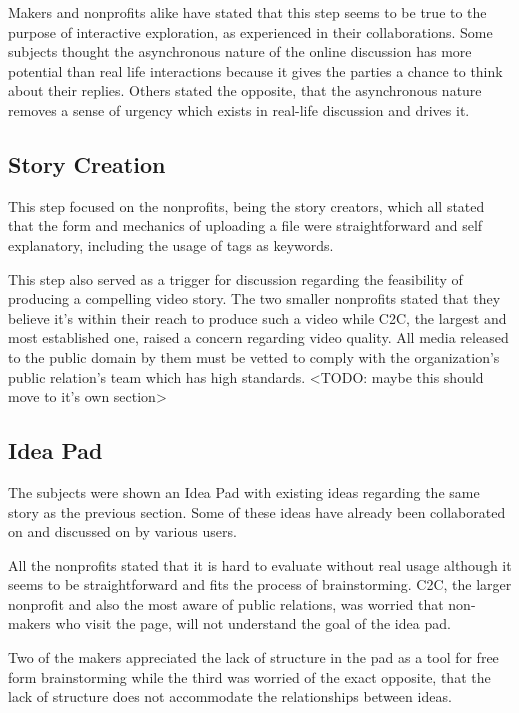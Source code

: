 Makers and nonprofits alike have stated that this step seems to be true to the purpose of interactive exploration, as experienced in their collaborations. Some subjects thought the asynchronous nature of the online discussion has more potential than real life interactions because it gives the parties a chance to think about their replies. Others stated the opposite, that the asynchronous nature removes a sense of urgency which exists in real-life discussion and drives it. 

\subsection{Story Creation}

This step focused on the nonprofits, being the story creators, which all stated that the form and mechanics of uploading a file were straightforward and self explanatory, including the usage of tags as keywords. 

This step also served as a trigger for discussion regarding the feasibility of producing a compelling video story. The two smaller nonprofits stated that they believe it's within their reach to produce such a video while C2C, the largest and most established one, raised a concern regarding video quality. All media released to the public domain by them must be vetted to comply with the organization's public relation's team which has high standards. 
<TODO: maybe this should move to it's own section>  

\subsection{Idea Pad}

The subjects were shown an Idea Pad with existing ideas regarding the same story as the previous section. Some of these ideas have already been collaborated on and discussed on by various users.

All the nonprofits stated that it is hard to evaluate without real usage although it seems to be straightforward and fits the process of brainstorming. C2C, the larger nonprofit and also the most aware of public relations, was worried that non-makers who visit the page, will not understand the goal of the idea pad.   

Two of the makers appreciated the lack of structure in the pad as a tool for free form brainstorming while the third was worried of the exact opposite, that the lack of structure does not accommodate the relationships between ideas.

